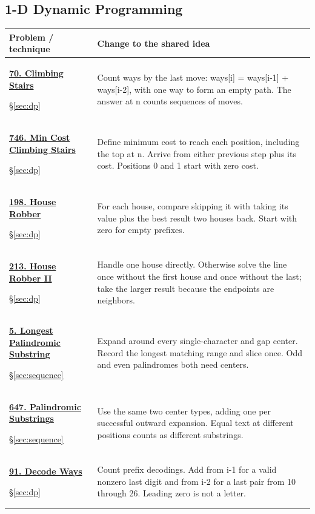 \documentclass[11pt]{article}
\newcommand{\sect}[1]{\hyperref[sec:#1]{\S\ref*{sec:#1}}}
\begin{document}
\subsection{1-D Dynamic Programming}
\begin{longtable}{@{}L{4.3cm}L{11.7cm}@{}}
\toprule Problem / technique & Change to the shared idea \\ \midrule\endhead
\hypertarget{lc70}{}\href{https://leetcode.com/problems/climbing-stairs/}{\textbf{70. Climbing Stairs}}\par\sect{dp} & Count ways by the last move: ways[i] = ways[i-1] + ways[i-2], with one way to form an empty path. The answer at n counts sequences of moves.\\[4pt]
\hypertarget{lc746}{}\href{https://leetcode.com/problems/min-cost-climbing-stairs/}{\textbf{746. Min Cost Climbing Stairs}}\par\sect{dp} & Define minimum cost to reach each position, including the top at n. Arrive from either previous step plus its cost. Positions 0 and 1 start with zero cost.\\[4pt]
\hypertarget{lc198}{}\href{https://leetcode.com/problems/house-robber/}{\textbf{198. House Robber}}\par\sect{dp} & For each house, compare skipping it with taking its value plus the best result two houses back. Start with zero for empty prefixes.\\[4pt]
\hypertarget{lc213}{}\href{https://leetcode.com/problems/house-robber-ii/}{\textbf{213. House Robber II}}\par\sect{dp} & Handle one house directly. Otherwise solve the line once without the first house and once without the last; take the larger result because the endpoints are neighbors.\\[4pt]
\hypertarget{lc5}{}\href{https://leetcode.com/problems/longest-palindromic-substring/}{\textbf{5. Longest Palindromic Substring}}\par\sect{sequence} & Expand around every single-character and gap center. Record the longest matching range and slice once. Odd and even palindromes both need centers.\\[4pt]
\hypertarget{lc647}{}\href{https://leetcode.com/problems/palindromic-substrings/}{\textbf{647. Palindromic Substrings}}\par\sect{sequence} & Use the same two center types, adding one per successful outward expansion. Equal text at different positions counts as different substrings.\\[4pt]
\hypertarget{lc91}{}\href{https://leetcode.com/problems/decode-ways/}{\textbf{91. Decode Ways}}\par\sect{dp} & Count prefix decodings. Add from i-1 for a valid nonzero last digit and from i-2 for a last pair from 10 through 26. Leading zero is not a letter.\\[4pt]

\end{longtable}
\end{document}
